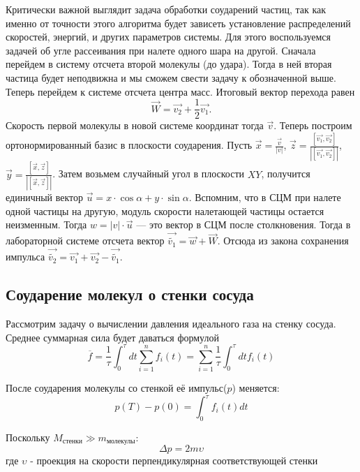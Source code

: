\documentclass[twoside,twocolumn]{article}
\theoremstyle{plain}
\theoremstyle{definition}
\begin{document}
\indent Критически важной выглядит задача обработки соударений частиц, так как именно от точности этого алгоритма будет зависеть установление распределений скоростей, энергий, и других параметров системы.
Для этого воспользуемся задачей об угле рассеивания при налете одного шара на другой.
Сначала перейдем в систему отсчета второй молекулы (до удара). Тогда в ней вторая частица будет неподвижна и мы сможем свести задачу к обозначенной выше. Теперь перейдем к системе отсчета центра масс. Итоговый вектор перехода равен
\begin{equation}
\overrightarrow{W} = \overrightarrow{v_2} + \frac{1}{2}\overrightarrow{v_1}.
\end{equation}
\indent Скорость первой молекулы в новой системе координат тогда $\overrightarrow{v}$.
Теперь построим ортонормированный базис в плоскости соударения. Пусть $\overrightarrow{x} = \frac{\overrightarrow{v}}{|v|}$, $\overrightarrow{z} = \frac{[\overrightarrow{v_1}, \overrightarrow{v_2}]}{|[\overrightarrow{v_1}, \overrightarrow{v_2}]|}$, $\overrightarrow{y} = \frac{[\overrightarrow{x}, \overrightarrow{z}]}{|[\overrightarrow{x}, \overrightarrow{z}]|}$. Затем возьмем случайный угол в плоскости $XY$, получится единичный вектор $\overrightarrow{u} = x \cdot \cos \alpha + y \cdot \sin \alpha$. Вспомним, что в СЦМ при налете одной частицы на другую, модуль скорости налетающей частицы остается неизменным. Тогда $w = |v| \cdot \overrightarrow{u}$ — это вектор в СЦМ после столкновения. Тогда в лабораторной системе отсчета вектор $\overrightarrow{\widetilde{v_1}} = \overrightarrow{w} + \overrightarrow{W}$. Отсюда из закона сохранения импульса $\overrightarrow{\widetilde{v_2}} = \overrightarrow{v_1} + \overrightarrow{v_2} - \overrightarrow{\widetilde{v_1}}$.
\subsection{Соударение молекул о стенки сосуда}
Рассмотрим задачу о вычислении давления идеального газа на стенку сосуда. Среднее суммарная сила будет даваться формулой
\begin{equation}
\overline{f} = \dfrac{1}{\tau} \int_0^\tau dt \sum_{i=1}^n f_i(t) = \sum_{i=1}^n \dfrac{1}{\tau} \int_0^\tau dt f_i(t)
\end{equation}

После соударения молекулы со стенкой её импульс($p$) меняется:
\[p(T) - p(0) = \int_0^\tau f_i(t) dt \]

Поскольку $M_\text{стенки} \gg m_\text{молекулы}$:
\[\Delta p = 2m\upsilon \]где $\upsilon$ - проекция на скорости перпендикулярная соответствующей стенки
\end{document}
